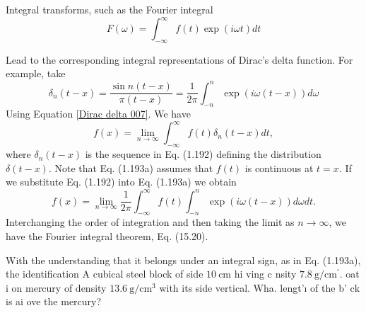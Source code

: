 Integral transforms, such as the Fourier integral
\begin{equation}
F(\omega)=\int_{-\infty}^{\infty} f(t) \exp (i \omega t) d t
\end{equation}

Lead to the corresponding integral representations of Dirac's delta function. For example, take
\begin{equation}
\delta_{n}(t-x)=\frac{\sin n(t-x)}{\pi(t-x)}=\frac{1}{2 \pi} \int_{-n}^{n} \exp (i \omega(t-x)) d \omega \label{Dirac delta 007}
\end{equation}
Using Equation \ref{Dirac delta 007}. We have
$$
f(x)=\lim _{n \rightarrow \infty} \int_{-\infty}^{\infty} f(t) \delta_{n}(t-x) d t,
$$
where $\delta_{n}(t-x)$ is the sequence in Eq. (1.192) defining the distribution $\delta(t-x)$. Note that Eq. (1.193a) assumes that $f(t)$ is continuous at $t=x$. If we substitute Eq. (1.192) into Eq. (1.193a) we obtain
$$
f(x)=\lim _{n \rightarrow \infty} \frac{1}{2 \pi} \int_{-\infty}^{\infty} f(t) \int_{-n}^{n} \exp (i \omega(t-x)) d \omega d t .
$$
Interchanging the order of integration and then taking the limit as $n \rightarrow \infty$, we have the Fourier integral theorem, Eq. (15.20).

With the understanding that it belongs under an integral sign, as in Eq. (1.193a), the identification
A cubical steel block of side $10 \mathrm{~cm}$ hi ving $\mathrm{c}$ nsity $7.8 \mathrm{~g} / \mathrm{cm}^{\prime}$. oat i on mercury of density $13.6 \mathrm{~g} / \mathrm{cm}^{3}$ with its side vertical. Wha. lengt'ı of the b' $\mathrm{ck}$ is ai ove the mercury?